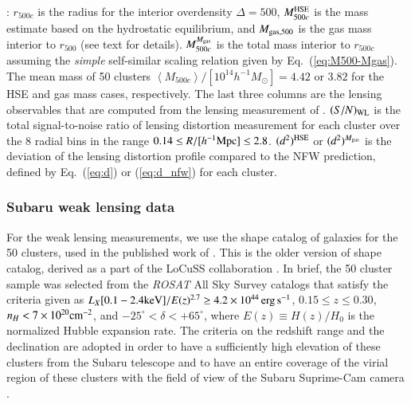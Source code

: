 \documentclass[iop, apj]{emulateapj}
\def\ave#1{\left\langle #1 \right\rangle}
\newcommand{\?}{\stackrel{?}{=}}
\begin{document}
\begin{table*}[H]
{  \citet{Martinoetal:14}:  
  $r_{500c}$ is the radius for the interior overdensity
  $\Delta=500$, $M_{500c}^{\rm HSE}$ is the mass estimate based on the
  hydrostatic equilibrium, and $M_{\rm gas, 500}$ is the gas mass
  interior to $r_{500}$ (see text for details).
  $M^{M_{\rm gas}}_{500c}$ is the total mass interior to $r_{500c}$
  assuming the {\it simple} self-similar scaling relation given by
  Eq.~(\ref{eq:M500-Mgas}). The mean mass of 50 clusters
  $\ave{M_{500c}}/[10^{14}h^{-1}M_\odot]=4.42$ or $3.82$ for the HSE and
  gas mass cases, respectively.
  The last three columns are the lensing
  observables that are computed from the lensing measurement of
  \citet{Okabeetal:13}. $(S/N)_{\rm WL}$ is the total signal-to-noise
  ratio of lensing distortion measurement for each cluster over the 8
  radial bins in the range $0.14\le R/[h^{-1}{\rm Mpc}]\le
  2.8$. $(d^2)^{\rm HSE}$ or $(d^2)^{M_{\rm gas}}$ is the deviation of
  the lensing distortion profile compared to the NFW prediction, defined
  by Eq.~(\ref{eq:d}) or (\ref{eq:d_nfw}) for each cluster.}
 \end{table*}


\subsubsection{Subaru weak lensing data}
\label{sec:subaru}

For the weak lensing measurements, we use the shape catalog of galaxies
for the 50 clusters, used in the published work of \citet{Okabeetal:13}.
This is the older version of shape catalog, derived as a part of the
LoCuSS collaboration \citep[see][for
details]{Okabeetal:10,Martinoetal:14}.  In brief, the 50 cluster sample
was selected from the {\it ROSAT} All Sky Survey catalogs
\citep{Ebelingetal:98, Ebelingetal:2000, Bohringeretal:04} that satisfy
the criteria given as $L_X[0.1-2.4{\rm keV}]/E(z)^{2.7}\ge
4.2\times10^{44}\,{\rm erg\,s^{-1}}$, $0.15\le z\le 0.30$,
$n_H<7\times10^{20}{\rm cm^{-2}}$, and $-25^\circ<\delta<+65^\circ$,
where $E(z)\equiv H(z)/H_0$ is the normalized Hubble expansion rate.
The criteria on the redshift range and the declination are adopted in
order to have a sufficiently high elevation of these clusters from the
Subaru telescope and to have an entire coverage of the virial region of
these clusters with the field of view of the Subaru Suprime-Cam camera
\citep{Miyazakietal:02}.
\end{document}
